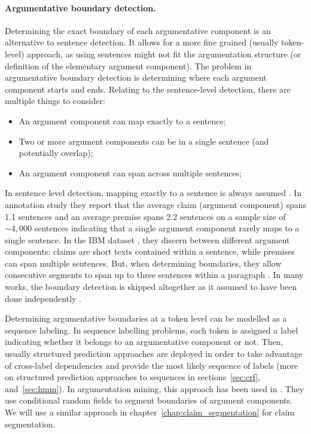 \paragraph{Argumentative boundary detection.} Determining the exact boundary of
each argumentative component is an alternative to sentence detection. It allows
for a more fine grained (usually token-level) approach, as using sentences
might not fit the argumentation structure (or definition of the elementary
argument component).  The problem in argumentative boundary detection is
determining where each argument component starts and ends.
Relating to the sentence-level detection, there are 
multiple things to consider:
\begin{itemize}
\item An argument component can map exactly to a sentence;
\item Two or more argument components can be in a single sentence (and potentially overlap);
\item An argument component can span across multiple sentences;
\end{itemize}
In sentence level detection, mapping exactly to a sentence is always assumed
\citep{palau2009argumentation, levy2014context}. 
In \citet{habernal2014argumentation} annotation study they report
that the average claim (argument component) spans 1.1 sentences and an average
premise spans 2.2 sentences on a sample size of ${\sim}4,000$ sentences 
indicating that a single argument component 
rarely maps to a single sentence. In the IBM dataset \citep{levy2014context},
they discern between different argument components: claims are short texts
contained within a sentence, while premises can span multiple sentences. But, when
determining boundaries, they allow consecutive segments to span up to three
sentences within a paragraph \citep{rinott2015show}.
In many works, the boundary detection is skipped altogether as it assumed to have
been done independently \citep{stab2014identifying, eckle2015role}. 

Determining argumentative boundaries at a token level can be modelled as a
sequence labeling. In sequence labelling problems, each token is assigned a
label indicating whether it belongs to an argumentative component or not.
Then, usually structured prediction approaches are deployed in order to take
advantage of cross-label
dependencies and provide the most likely sequence of labels
(more on structured prediction approaches to sequences
in sections~\ref{sec:crf}, and~\ref{sec:hmm}).  In argumentation mining, this
approach has been used in \citep{goudas2014argument, sardianos2015argument,
park2015conditional}.  They use conditional random fields to segment boundaries
of argument components.  We will use a similar approach in
chapter~\ref{chap:claim_segmentation} for claim segmentation. 

